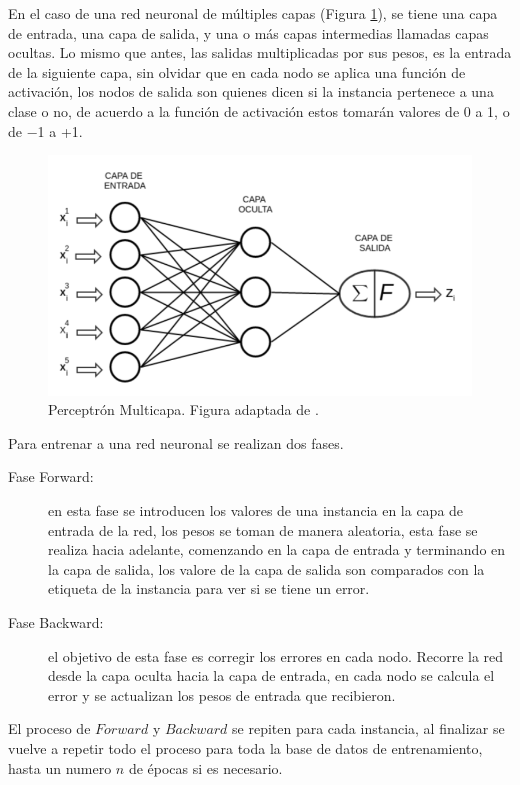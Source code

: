 En el caso de una red neuronal de múltiples capas (Figura \ref{fig:mlp}), se tiene una capa de entrada, una capa de salida, y una o más capas intermedias llamadas capas ocultas. Lo mismo que antes, las salidas multiplicadas por sus pesos, es la entrada de la siguiente capa, sin olvidar que en cada nodo se aplica una función de activación, los nodos de salida son quienes dicen si la instancia pertenece a una clase o no, de acuerdo a la función de activación estos tomarán valores de 0 a 1, o de −1 a +1.
\begin{figure}[ht]
 \centering
	\includegraphics[width=0.75\columnwidth]{chapter3/mlp.png}
 \caption{Perceptrón Multicapa. Figura adaptada de \cite{TheNNBook}.}
 \label{fig:mlp}
\end{figure}

Para entrenar a una red neuronal se realizan dos fases.
 
 \begin{description}
 \item [Fase Forward:] en esta fase se introducen los valores de una instancia en la capa de entrada de la red, los pesos se toman de manera aleatoria, esta fase se realiza hacia adelante, comenzando en la capa de entrada y terminando en la capa de salida, los valore de la capa de salida son comparados con la etiqueta de la instancia para ver si se tiene un error.
 

 \item [Fase Backward:] el objetivo de esta fase es corregir los errores en cada nodo. Recorre la red desde la capa oculta hacia la capa de entrada, en cada nodo se calcula el error y se actualizan los pesos de entrada que recibieron. 
 \end{description}
 
 El proceso de $Forward$ y $Backward$ se repiten para cada instancia, al finalizar se vuelve a repetir todo el proceso para toda la base de datos de entrenamiento, hasta un numero $n$ de épocas si es necesario. 
 
